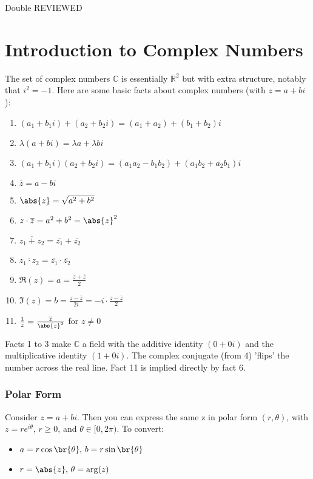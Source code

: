 \setcounter{section}{0}
\setcounter{theorem}{0}
Double REVIEWED

\section{Introduction to Complex Numbers}\label{sec:intro-cplx-nums}

The set of complex numbers $\mathbb{C}$ is essentially $\mathbb{R}^2$ but with extra structure, notably that $i^2=-1$. Here are some basic facts about complex numbers (with $z=a+bi$):
\begin{enumerate}
    \item $(a_1+b_1i)+(a_2+b_2i)=(a_1+a_2)+(b_1+b_2)i$
    \item $\lambda(a+bi)=\lambda a + \lambda b i$
    \item $(a_1+b_1i)(a_2+b_2i)=(a_1a_2-b_1b_2)+(a_1b_2+a_2b_1)i$
    \item $\overline{z}=a-bi$
    \item $\abs{z}=\sqrt{a^2+b^2}$
    \item $z \cdot \overline{z}=a^2+b^2= \abs{z}^2$
    \item $\overline{z_1+z_2}=\overline{z_1}+\overline{z_2}$
    \item $\overline{z_1 \cdot z_2} = \overline{z_1} \cdot \overline{z_2}$
    \item $\Re(z)=a=\frac{z+\overline{z}}{2}$
    \item $\Im(z) = b = \frac{z-\overline{z}}{2i} = -i\cdot\frac{z-\overline{z}}{2}$
    \item $\frac{1}{z} = \frac{\overline{z}}{\abs{z}^2}$ for $z \neq 0$
\end{enumerate}

Facts 1 to 3 make $\mathbb{C}$ a field with the additive identity $(0+0i)$ and the multiplicative identity $(1+0i)$. The complex conjugate (from 4) 'flips' the number across the real line. Fact 11 is implied directly by fact 6.

\subsubsection{Polar Form}

Consider $z=a+bi$. Then you can express the same z in polar form $(r,\theta)$, with $z= r e^{i\theta}$, $r\geq0$, and $\theta \in [0,2 \pi)$. To convert:
\begin{itemize}
    \item $a=r \cos \br{ \theta } , \, b=r \sin \br{\theta}$
    \item $r = \abs{z}, \, \theta = \arg(z)$
\end{itemize}

